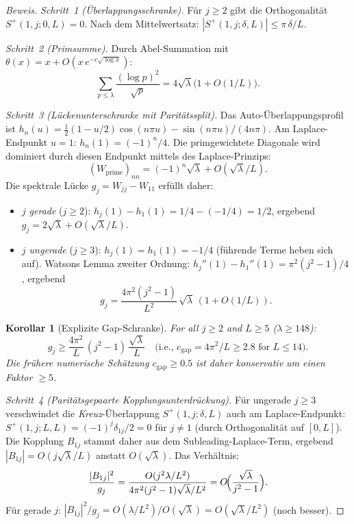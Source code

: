 \documentclass[12pt,a4paper]{article}
\newtheorem{corollary}[theorem]{Korollar}
\theoremstyle{definition}
\theoremstyle{remark}
\begin{document}
\begin{proof}[Beweis]
\emph{Schritt~1 (Überlappungsschranke).} Für $j \geq 2$ gibt die Orthogonalität $S^+(1,j;0,L) = 0$. Nach dem Mittelwertsatz: $|S^+(1,j;\delta,L)| \leq \pi\,\delta/L$.

\emph{Schritt~2 (Primsumme).} Durch Abel-Summation mit $\theta(x) = x + O(x\,e^{-c\sqrt{\log x}})$:
\[
  \sum_{p \leq \lambda}\frac{(\log p)^2}{\sqrt{p}} = 4\sqrt{\lambda}\bigl(1 + O(1/L)\bigr).
\]

\emph{Schritt~3 (Lückenunterschranke mit Paritätssplit).} Das Auto-Überlappungsprofil ist $h_n(u) = \tfrac{1}{2}(1-u/2)\cos(n\pi u) - \sin(n\pi u)/(4n\pi)$. Am Laplace-Endpunkt $u = 1$: $h_n(1) = (-1)^n/4$. Die primgewichtete Diagonale wird dominiert durch diesen Endpunkt mittels des Laplace-Prinzips:
\[
  (W_{\mathrm{prime}})_{nn} = (-1)^n\sqrt{\lambda} + O(\sqrt{\lambda}/L).
\]
Die spektrale Lücke $g_j = W_{jj} - W_{11}$ erfüllt daher:
\begin{itemize}
  \item \emph{$j$ gerade} ($j \geq 2$): $h_j(1) - h_1(1) = 1/4 - (-1/4) = 1/2$, ergebend $g_j = 2\sqrt{\lambda} + O(\sqrt{\lambda}/L)$.
  \item \emph{$j$ ungerade} ($j \geq 3$): $h_j(1) = h_1(1) = -1/4$ (führende Terme heben sich auf). Watsons Lemma zweiter Ordnung: $h_j''(1) - h_1''(1) = \pi^2(j^2-1)/4$, ergebend
  \begin{equation}
  \label{eq:gap-odd}
    g_j = \frac{4\pi^2(j^2-1)}{L^2}\,\sqrt{\lambda}\,(1 + O(1/L)).
  \end{equation}
\end{itemize}

\begin{corollary}[Explizite Gap-Schranke]
\label{cor:explicit-gap}
For all $j \geq 2$ and $L \geq 5$ ($\lambda \geq 148$):
\[
  g_j \geq \frac{4\pi^2}{L}\,(j^2 - 1)\,\frac{\sqrt{\lambda}}{L}
  \quad\text{(i.e., } c_{\mathrm{gap}} = 4\pi^2/L \geq 2.8 \text{ for } L \leq 14\text{)}.
\]
Die frühere numerische Schätzung $c_{\mathrm{gap}} \geq 0.5$ ist daher konservativ um einen Faktor $\geq 5$.
\end{corollary}

\emph{Schritt~4 (Paritätsgepaarte Kopplungsunterdrückung).} Für ungerade $j \geq 3$ verschwindet die \emph{Kreuz}-Überlappung $S^+(1,j;\delta,L)$ auch am Laplace-Endpunkt: $S^+(1,j;L,L) = (-1)^j\delta_{1j}/2 = 0$ für $j \neq 1$ (durch Orthogonalität auf $[0,L]$). Die Kopplung $B_{1j}$ stammt daher aus dem Subleading-Laplace-Term, ergebend $|B_{1j}| = O(j\sqrt{\lambda}/L)$ anstatt $O(\sqrt{\lambda})$. Das Verhältnis:
\[
  \frac{|B_{1j}|^2}{g_j} = \frac{O(j^2\lambda/L^2)}{4\pi^2(j^2-1)\sqrt{\lambda}/L^2} = O\!\Bigl(\frac{\sqrt{\lambda}}{j^2-1}\Bigr).
\]
Für gerade $j$: $|B_{1j}|^2/g_j = O(\lambda/L^2)/O(\sqrt{\lambda}) = O(\sqrt{\lambda}/L^2)$ (noch besser).


\end{proof}
\end{document}
